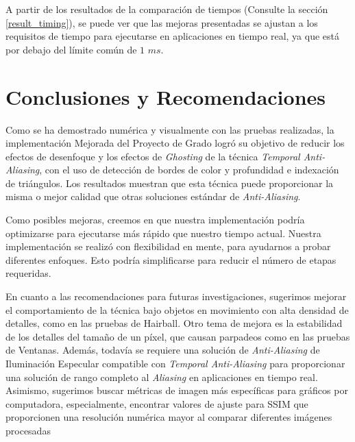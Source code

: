 \documentclass[pregrado]{tesis-usb} %
\begin{document}
A partir de los resultados de la comparación de tiempos (Consulte la sección \ref{result_timing}), se puede ver que las mejoras presentadas se ajustan a los requisitos de tiempo para ejecutarse en aplicaciones en tiempo real, ya que está por debajo del límite común de $1$ $ms$.


\chapter{Conclusiones y Recomendaciones}
Como se ha demostrado numérica y visualmente con las pruebas realizadas, la implementación Mejorada del Proyecto de Grado logró su objetivo de reducir los efectos de desenfoque y los efectos de \textit{Ghosting} de la técnica \textit{Temporal Anti-Aliasing}, con el uso de detección de bordes de color y profundidad e indexación de triángulos. Los resultados muestran que esta técnica puede proporcionar la misma o mejor calidad que otras soluciones estándar de \textit{Anti-Aliasing}. 

Como posibles mejoras, creemos en que nuestra implementación podría optimizarse para ejecutarse más rápido que nuestro tiempo actual. Nuestra implementación se realizó con flexibilidad en mente, para ayudarnos a probar diferentes enfoques. Esto podría simplificarse para reducir el número de etapas requeridas.

En cuanto a las recomendaciones para futuras investigaciones, sugerimos mejorar el comportamiento de la técnica bajo objetos en movimiento con alta densidad de detalles, como en las pruebas de Hairball. Otro tema de mejora es la estabilidad de los detalles del tamaño de un píxel, que causan parpadeos como en las pruebas de Ventanas. Además, todavía se requiere una solución de \textit{Anti-Aliasing} de Iluminación Especular compatible con \textit{Temporal Anti-Aliasing} para proporcionar una solución de rango completo al \textit{Aliasing} en aplicaciones en tiempo real. Asimismo, sugerimos buscar métricas de imagen más específicas para gráficos por computadora, especialmente, encontrar valores de ajuste para SSIM que proporcionen una resolución numérica mayor al comparar diferentes imágenes procesadas




\appendix
\end{document}
